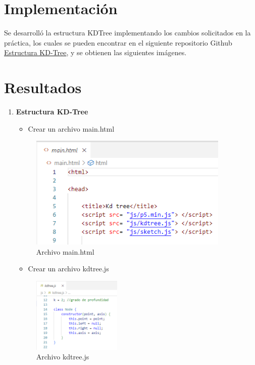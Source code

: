 \documentclass{article}
\begin{document}
\section{Implementación}

  Se desarrolló la estructura KDTree implementando los cambios solicitados en la práctica, los cuales se pueden encontrar en el siguiente repositorio Github \href{https://github.com/nestorcal/kdtree}{Estructura KD-Tree}, y se obtienen las siguientes imágenes.


\section{Resultados}

    \begin{enumerate}
    
        \item \textbf{Estructura KD-Tree}

\begin{itemize}
   \item Crear un archivo main.html
\end{itemize}

\begin{figure}[H]
\centering
\includegraphics[width=0.9\textwidth]{Img/main.html.png}
\caption{Archivo main.html}
\end{figure}

\begin{itemize}
   \item Crear un archivo kdtree.js
\end{itemize}

\begin{figure}[H]
\centering
\includegraphics[width=0.4\textwidth]{Img/kdtree.js.png}
\caption{Archivo kdtree.js}
\end{figure}


\end{enumerate}
\end{document}
